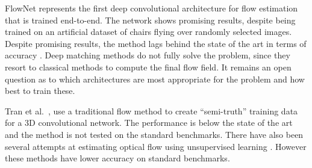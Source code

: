 \documentclass[10pt,twocolumn,letterpaper]{article}
\newcommand\myworries[1]{\textcolor{red}{#1}}
\begin{document}
FlowNet \cite{dosovitskiy2015flownet} represents the first deep convolutional architecture for flow estimation that is trained end-to-end. 
The network shows promising results, despite being trained on an artificial dataset of chairs flying over randomly selected images.
Despite promising results, the method lags behind the state of the art in terms of accuracy \cite{dosovitskiy2015flownet}.  
Deep matching methods \cite{guney2016ACCV,epicflow,weinzaepfel2013deepflow,thewlis2016fully} do not fully solve the problem, since they resort to classical methods to compute the final flow field.
It remains an open question as to which architectures are most appropriate for the problem and how best to train these.



Tran et al.~\cite{Tran:End2End:2016}, use a traditional flow method to create ``semi-truth'' training data for a 3D convolutional network. 
The performance is below the state of the art and the method is not tested on the standard benchmarks.
There have also been several attempts at estimating optical flow using unsupervised learning \cite{ahmadi2016unsupervised,yu2016back}. 
However these methods have lower accuracy on standard benchmarks.




\end{document}
